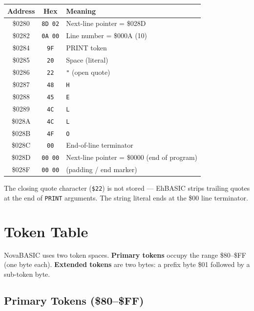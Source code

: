 \begin{center}
\begin{tabular}{ccl}
\toprule
\textbf{Address} & \textbf{Hex} & \textbf{Meaning} \\
\midrule
\$0280 & \texttt{8D 02} & Next-line pointer = \$028D \\
\$0282 & \texttt{0A 00} & Line number = \$000A (10) \\
\$0284 & \texttt{9F}    & PRINT token \\
\$0285 & \texttt{20}    & Space (literal) \\
\$0286 & \texttt{22}    & \texttt{"} (open quote) \\
\$0287 & \texttt{48}    & \texttt{H} \\
\$0288 & \texttt{45}    & \texttt{E} \\
\$0289 & \texttt{4C}    & \texttt{L} \\
\$028A & \texttt{4C}    & \texttt{L} \\
\$028B & \texttt{4F}    & \texttt{O} \\
\$028C & \texttt{00}    & End-of-line terminator \\
\midrule
\$028D & \texttt{00 00} & Next-line pointer = \$0000 (end of program) \\
\$028F & \texttt{00 00} & (padding / end marker) \\
\bottomrule
\end{tabular}
\end{center}

\begin{notebox}
The closing quote character (\texttt{\$22}) is not stored --- EhBASIC strips
trailing quotes at the end of \texttt{PRINT} arguments.  The string literal
ends at the \$00 line terminator.
\end{notebox}

\section{Token Table}
\label{sec:token-table}

NovaBASIC uses two token spaces.  \textbf{Primary tokens} occupy the range
\$80--\$FF (one byte each).  \textbf{Extended tokens} are two bytes: a prefix
byte \$01 followed by a sub-token byte.

\subsection{Primary Tokens (\$80--\$FF)}

